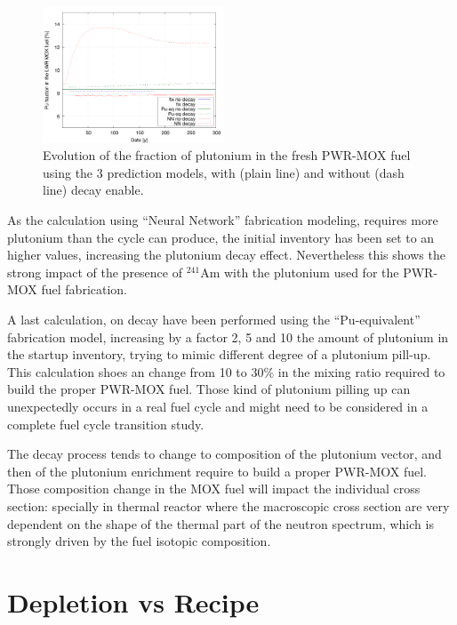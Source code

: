 \documentclass{anstrans}
\begin{document}
\begin{figure}[ht] %
  \centering 
  \includegraphics[width=0.48\textwidth]{decay_pu_contribution.png}
  \caption{Evolution of the fraction of plutonium in the fresh PWR-MOX fuel
    using the 3 prediction models, with (plain line) and without (dash line)
    decay enable.}
  \label{fig:d} 
\end{figure}

As the calculation using ``Neural Network'' fabrication modeling, requires more
plutonium than the cycle can produce, the initial inventory has been set to an
higher values, increasing the plutonium decay effect. Nevertheless this shows
the strong impact of the presence of $^{241}$Am with the plutonium used for the
PWR-MOX fuel fabrication.

A last calculation, on decay have been performed using the ``Pu-equivalent''
fabrication model, increasing by a factor 2, 5 and 10 the amount of plutonium in
the startup inventory, trying to mimic different degree of a plutonium pill-up.
This calculation shoes an change from 10 to 30\% in the mixing ratio required to
build the proper PWR-MOX fuel. Those kind of plutonium pilling up can
unexpectedly occurs in a real fuel cycle and might need to be considered in a
complete fuel cycle transition study.

The decay process tends to change to composition of the plutonium vector, and
then of the plutonium enrichment require to build a proper PWR-MOX fuel. Those
composition change in the MOX fuel will impact the individual cross section:
specially in thermal reactor where the macroscopic cross section are very
dependent on the shape of the thermal part of the neutron spectrum, which is
strongly driven by the fuel isotopic composition.


\section{Depletion vs Recipe}
\end{document}
